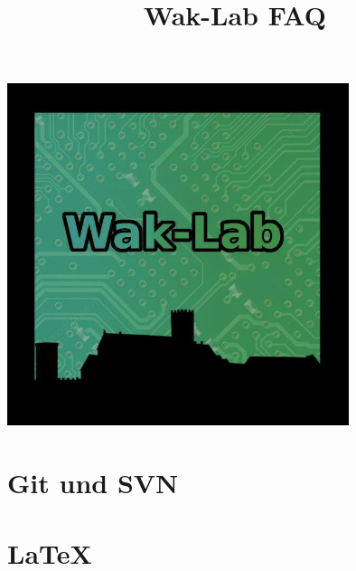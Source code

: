 

\title{Wak-Lab FAQ}


\maketitle

\maketitle
\begin{center}
\includegraphics[height=10cm]{pictures/LOGO.jpg}
\end{center}
\newpage
\section{Git und SVN}

\section{\LaTeX}




